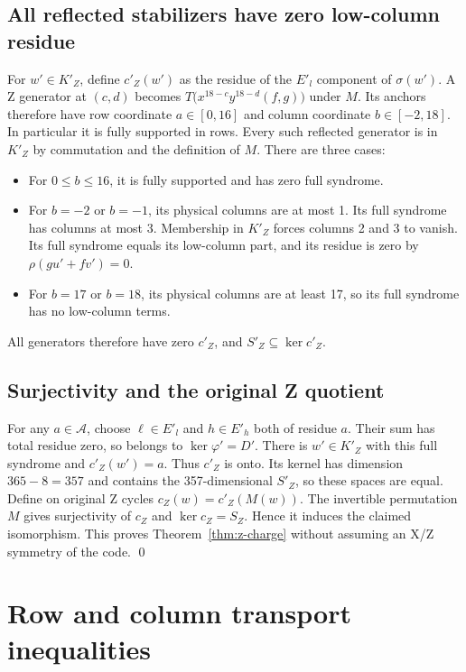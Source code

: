 \documentclass{article}
\begin{document}
\subsection{All reflected stabilizers have zero low-column residue}\label{sec:z-stabilizers}

For \(w'\in K'_Z\), define \(c'_Z(w')\) as the residue of the
\(E'_l\) component of \(\sigma(w')\).
A Z generator at \((c,d)\) becomes
\(T\bigl(x^{18-c}y^{18-d}(f,g)\bigr)\) under \(M\).
Its anchors therefore have row coordinate \(a\in[0,16]\) and column
coordinate \(b\in[-2,18]\). In particular it is fully supported in rows.
Every such reflected generator is in \(K'_Z\) by commutation and the
definition of \(M\). There are three cases:
\begin{itemize}
  \item For \(0\le b\le 16\), it is fully supported and has zero full syndrome.
  \item For \(b=-2\) or \(b=-1\), its physical columns are at most 1.
    Its full syndrome has columns at most 3. Membership in \(K'_Z\)
    forces columns 2 and 3 to vanish. Its full syndrome equals its
    low-column part, and its residue is zero by \(\rho(gu'+fv')=0\).
  \item For \(b=17\) or \(b=18\), its physical columns are at least 17,
    so its full syndrome has no low-column terms.
\end{itemize}

All generators therefore have zero \(c'_Z\), and
\(S'_Z\subseteq\ker c'_Z\).

\subsection{Surjectivity and the original Z quotient}\label{sec:z-quotient}

For any \(a\in\mathcal{A}\), choose \(\ell\in E'_l\) and \(h\in E'_h\)
both of residue \(a\). Their sum has total residue zero, so belongs to
\(\ker\varphi'=D'\). There is \(w'\in K'_Z\) with this full syndrome and
\(c'_Z(w')=a\). Thus \(c'_Z\) is onto.
Its kernel has dimension \(365-8=357\) and contains the
357-dimensional \(S'_Z\), so these spaces are equal.
Define on original Z cycles \(c_Z(w)=c'_Z(M(w))\).
The invertible permutation \(M\) gives surjectivity of \(c_Z\) and
\(\ker c_Z=S_Z\). Hence it induces the claimed isomorphism.
This proves Theorem~\ref{thm:z-charge} without assuming an X/Z symmetry of the
code. \qed

\section{Row and column transport inequalities}\label{sec:transport}
\end{document}
